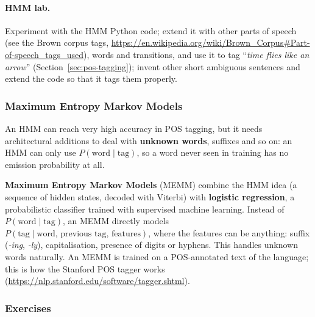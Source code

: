 \paragraph{HMM lab.} Experiment with the HMM Python code; extend it with other parts of
speech (see the Brown corpus tags,
\url{https://en.wikipedia.org/wiki/Brown_Corpus#Part-of-speech_tags_used}), words and
transitions, and use it to tag ``\emph{time flies like an arrow}''
(Section~\ref{sec:pos-tagging}); invent other short ambiguous sentences and extend the
code so that it tags them properly.

\subsubsection{Maximum Entropy Markov Models}

An HMM can reach very high accuracy in POS tagging, but it needs architectural
additions to deal with \textbf{unknown words}, suffixes and so on: an HMM can only use
$P(\text{word}\mid\text{tag})$, so a word never seen in training has no emission
probability at all.

\textbf{Maximum Entropy Markov Models} (MEMM) combine the HMM idea (a sequence of
hidden states, decoded with Viterbi) with \textbf{logistic regression}, a probabilistic
classifier trained with supervised machine learning. Instead of $P(\text{word} \mid
\text{tag})$, an MEMM directly models $P(\text{tag} \mid \text{word, previous tag,
features})$, where the features can be anything: suffix (\emph{-ing}, \emph{-ly}),
capitalisation, presence of digits or hyphens. This handles unknown words naturally. An
MEMM is trained on a POS-annotated text of the language; this is how the Stanford POS
tagger works (\url{https://nlp.stanford.edu/software/tagger.shtml}).

\subsubsection{Exercises}
\notinslides

